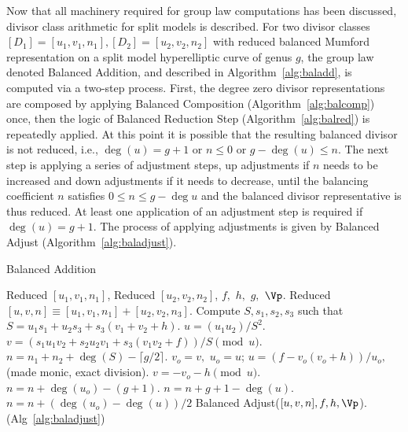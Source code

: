 Now that all machinery required for group law computations has been discussed,
divisor class arithmetic for split models is described. For two
divisor classes $[D_1] = [u_1,v_1,n_1], [D_2] = [u_2,v_2,n_2]$ with reduced
balanced Mumford representation on a split model hyperelliptic curve of genus
$g$, the group law denoted Balanced Addition, and described in
Algorithm~\ref{alg:baladd}, is computed via a two-step process. First, the
degree zero divisor representations are composed by applying Balanced
Composition (Algorithm~\ref{alg:balcomp}) once, then the logic of Balanced
Reduction Step (Algorithm~\ref{alg:balred}) is repeatedly applied. At this point
it is possible that the resulting balanced divisor is not reduced, i.e., $\deg(u) =
g+1$ or $n \leq 0$ or $g-\deg(u) \leq n$. The next step is applying a series of
adjustment steps, up adjustments if $n$ needs to be increased and down
adjustments if it needs to decrease, until the balancing coefficient $n$
satisfies $0 \leq n \leq g - \deg u$ and the balanced divisor representative is
thus reduced. At least one application of an adjustment step is required if
$\deg(u) = g+1$. The process of applying adjustments is given by Balanced Adjust
(Algorithm~\ref{alg:baladjust}).

\begin{algorithm}[ht]
  \caption{Balanced Addition}
  \label{alg:baladd}
  {\fontsize{12}{18}\selectfont
  \begin{algorithmic}[1]
  \Require Reduced $[u_1,v_1,n_1]$, Reduced $[u_2,v_2,n_2]$, $f,$ $h,$ $g,$ $\Vp$.
  \Ensure Reduced $[u,v,n] \equiv [u_1,v_1,n_1] + [u_2,v_2,n_3]$.
  \vspace{5pt}
  \State Compute $S,s_1,s_2,s_3$ such that $S = u_1s_1 + u_2s_3 + s_3(v_1 + v_2
  + h)$. 
  \State $u = (u_1u_2)/S^2$. 
  \State $v = (s_1u_1v_2 + s_2u_2v_1 + s_3(v_1v_2 + f))/S \pmod{u}$. 
  \State $n = n_1 + n_2  + \deg(S) - \lceil g/2 \rceil$. 
    \State $v_o = v,$ $u_o = u$;
    \State $u = (f-v_o(v_o + h))/u_o,$ (made monic, exact division). 
    \State $v = -v_o - h \pmod{u}$.
      \State $n = n + \deg(u_o) - (g+1)$.
      \State $n = n + g + 1 - \deg(u)$.
    \Else
      \State $n = n + (\deg(u_o) - \deg(u))/2$
    \EndIf
  \EndWhile
  \State \Return Balanced Adjust($[u,v,n],f,h,\Vp$). (Alg~\ref{alg:baladjust})
  \end{algorithmic}
  }
\end{algorithm}

